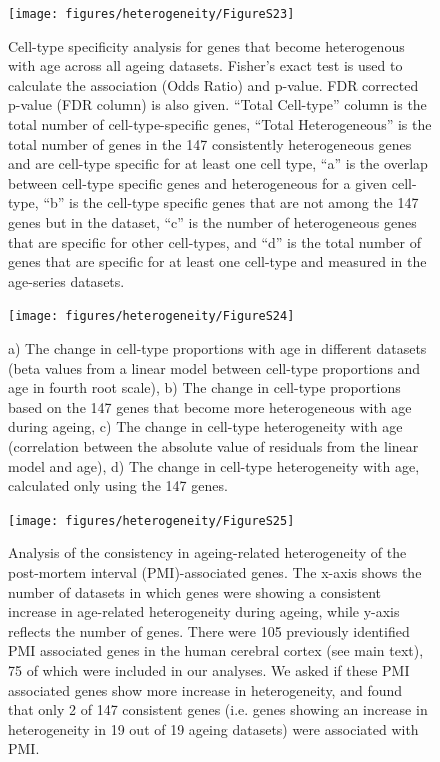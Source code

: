 \documentclass[12pt,twoside]{unicam}
\begin{document}
\begin{figure}

{\centering \texttt{[image: figures/heterogeneity/FigureS23]} 

}

\caption[Cell-type specificity analysis for genes that become heterogenous with age across all ageing datasets.]{Cell-type specificity analysis for genes that become heterogenous with age across all ageing datasets. Fisher’s exact test is used to calculate the association (Odds Ratio) and p-value. FDR corrected p-value (FDR column) is also given. “Total Cell-type” column is the total number of cell-type-specific genes, “Total Heterogeneous” is the total number of genes in the 147 consistently heterogeneous genes and are cell-type specific for at least one cell type, “a” is the overlap between cell-type specific genes and heterogeneous for a given cell-type, “b” is the cell-type specific genes that are not among the 147 genes but in the dataset, “c” is the number of heterogeneous genes that are specific for other cell-types, and “d” is the total number of genes that are specific for at least one cell-type and measured in the age-series datasets.}\label{fig:hetFigS23}
\end{figure}

\begin{figure}

{\centering \texttt{[image: figures/heterogeneity/FigureS24]} 

}

\caption[The change in cell-type proportions and heterogeneities with age in different datasets.]{a) The change in cell-type proportions with age in different datasets (beta values from a linear model between cell-type proportions and age in fourth root scale), b) The change in cell-type proportions based on the 147 genes that become more heterogeneous with age during ageing, c) The change in cell-type heterogeneity with age (correlation between the absolute value of residuals from the linear model and age), d) The change in cell-type heterogeneity with age, calculated only using the 147 genes.}\label{fig:hetFigS24}
\end{figure}

\begin{figure}

{\centering \texttt{[image: figures/heterogeneity/FigureS25]} 

}

\caption[Association between the consistent heterogeneity and post-mortem intervals.]{Analysis of the consistency in ageing-related heterogeneity of the post-mortem interval (PMI)-associated genes. The x-axis shows the number of datasets in which genes were showing a consistent increase in age-related heterogeneity during ageing, while y-axis reflects the number of genes. There were 105 previously identified PMI associated genes in the human cerebral cortex (see main text), 75 of which were included in our analyses. We asked if these PMI associated genes show more increase in heterogeneity, and found that only 2 of 147 consistent genes (i.e. genes showing an increase in heterogeneity in 19 out of 19 ageing datasets) were associated with PMI.}\label{fig:hetFigS25}
\end{figure}
\end{document}
